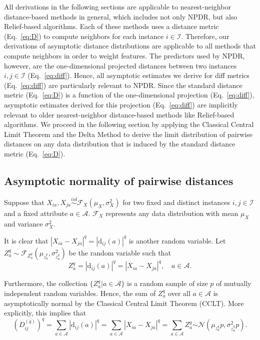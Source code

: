 \documentclass[10pt,letterpaper]{article}
\begin{document}
All derivations in the following sections are applicable to nearest-neighbor distance-based methods in general, which includes not only NPDR, but also Relief-based algorithms. Each of these methods uses a distance metric (Eq.~\ref{eq:D}) to compute neighbors for each instance $i \in \mathcal{I}$. Therefore, our derivations of asymptotic distance distributions are applicable to all methods that compute neighbors in order to weight features. The predictors used by NPDR, however, are the one-dimensional projected distances between two instances $i,j \in \mathcal{I}$ (Eq.~\ref{eq:diff}). Hence, all asymptotic estimates we derive for diff metrics (Eq.~\ref{eq:diff}) are particularly relevant to NPDR. Since the standard distance metric (Eq.~\ref{eq:D}) is a function of the one-dimensional projection (Eq.~\ref{eq:diff}), asymptotic estimates derived for this projection (Eq.~\ref{eq:diff}) are implicitly relevant to older nearest-neighbor distance-based methods like Relief-based algorithms. We proceed in the following section by applying the Classical Central Limit Theorem and the Delta Method to derive the limit distribution of pairwise distances on any data distribution that is induced by the standard distance metric (Eq.~\ref{eq:D}).

\subsection*{Asymptotic normality of pairwise distances}

Suppose that $X_{ia}, X_{ja} \overset{iid}{\sim} \mathcal{F}_X\left(\mu_X,\sigma^2_X\right)$ for two fixed and distinct instances $i,j \in \mathcal{I}$ and a fixed attribute $a \in \mathcal{A}$.
$\mathcal{F}_X$ represents any data distribution with mean $\mu_X$ and variance $\sigma^2_X$.

It is clear that $|X_{ia} - X_{ja}|^q = |\text{d}_{ij}(a)|^q$ is another random variable. Let $Z^q_a \sim \mathcal{F}_{Z^q_a}\left(\mu_{z^q_a},\sigma^2_{z^q_a}\right)$ be the random variable such that
%
\begin{equation}\label{eq:diffDistr}
Z^q_a = |\text{d}_{ij}(a)|^q = |X_{ia} - X_{ja}|^q, \quad a \in \mathcal{A}.
\end{equation}

Furthermore, the collection $\{Z^q_a | a \in \mathcal{A}\}$ is a random sample of size $p$ of mutually independent random variables. Hence, the sum of $Z^q_a$ over all $a \in \mathcal{A}$ is asymptotically normal by the Classical Central Limit Theorem (CCLT). More explicitly, this implies that
%
\begin{equation}\label{eq:DqAsympt}
\left(D^{(q)}_{ij}\right)^q = \sum_{a \in \mathcal{A}} |\text{d}_{ij}(a)|^q = \sum_{a \in \mathcal{A}} |X_{ia} - X_{ja}|^q = \sum_{a \in \mathcal{A}} Z^q_a \overset{.}{\sim} \mathcal{N}\left(\mu_{z^q_a}p,\sigma^2_{z^q_a}p\right).
\end{equation}
\end{document}
